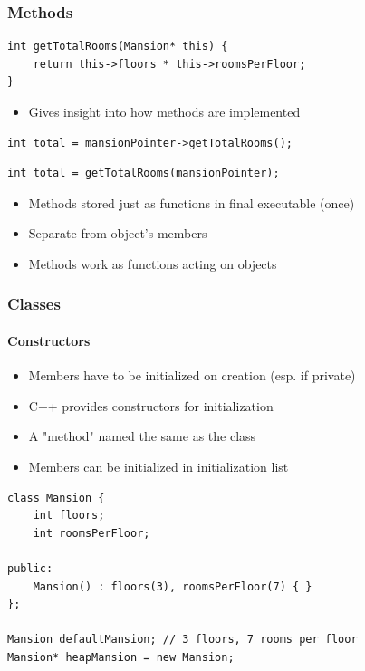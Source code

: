 \documentclass[table]{beamer}
\newcommand{\declarelesson}{\textbf{\color{themegreen}{Lesson:}} }
\newcommand{\declarebts}{\textbf{\color{themeorange}{Behind the Scenes:}} }
\begin{document}
\begin{frame}[fragile]
    \frametitle{\declarebts Methods }
    \begin{lstlisting}[title=\texttt{this} pointer idiom in C]
int getTotalRooms(Mansion* this) {
    return this->floors * this->roomsPerFloor;
}
    \end{lstlisting}
    \begin{itemize}
        \item Gives insight into how methods are implemented
    \end{itemize}
    \begin{lstlisting}[title=Calling an object's method]
int total = mansionPointer->getTotalRooms();
    \end{lstlisting}
    \begin{lstlisting}[title=Behind the scenes]
int total = getTotalRooms(mansionPointer);
    \end{lstlisting}
    \begin{itemize}
        \item Methods stored just as functions in final executable (once)
        \item Separate from object's members
        \item Methods work as functions acting on objects
    \end{itemize}
\end{frame}





\begin{frame}[fragile]
    \frametitle{\declarelesson Classes }
    \framesubtitle{Constructors}
    \begin{itemize}
        \item Members have to be initialized on creation (esp. if private)
        \item C++ provides constructors for initialization
        \item A "method" named the same as the class
        \item Members can be initialized in initialization list
    \end{itemize}
    \begin{lstlisting}[title=Default Constructor]
class Mansion {
    int floors;
    int roomsPerFloor;

public:
    Mansion() : floors(3), roomsPerFloor(7) { }
};

Mansion defaultMansion; // 3 floors, 7 rooms per floor
Mansion* heapMansion = new Mansion;
    \end{lstlisting}
\end{frame}
\end{document}
